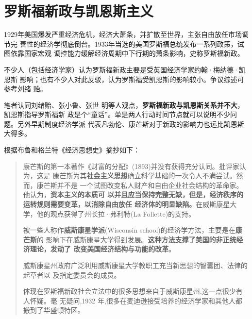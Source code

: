 \chapter{罗斯福新政与凯恩斯主义}


1929年美国爆发严重经济危机，经济大萧条，并扩散至世界，主张自由放任市场调节完
善性的经济学彻底倒台。1933年当选的美国罗斯福总统发布一系列政策，试图依靠国家宏观
调控能力缓解经济周期中下行期的萧条影响，史称罗斯福新政。

不少人（包括经济学家）认为罗斯福新政主要是受英国经济学家约翰·梅纳德·凯恩斯
影响；也有不少人对此反驳，认为罗斯福受凯恩斯的影响较小。争议综述可参考刘绪
贻。

笔者认同刘绪贻\cite{roosevelt}、张小鲁\cite{bijiao202002}、张世
明\cite{JJFX200100010}等人观点，\textbf{罗斯福新政与凯恩斯关系并不大}，凯恩斯指导罗斯福新
政是个“童话”。单是两人行动时间节点就可以说明不少问题。另外早期制度经济学派
代表凡勃伦、康芒斯对于新政的影响力也远比凯恩斯大得多。

根据布鲁和格兰特《经济思想史》摘抄如下：
\begin{quotation}
  康芒斯的第一本著作《财富的分配》(1893)并没有获得充分认同。批评家认为，这是
  康芒斯为其\textbf{社会主义思想}确立科学基础的一次令人不满尝试。然而，康芒斯并不是
  一个试图改变私人财产和自由企业社会结构的革命家。他认为，\textbf{资本主义的本质可
    以并且应当保持完整无缺，但是，经济秩序的运转规则需要变革，以消除自由放任
    经济体的明显缺陷。}在威斯康星大学，他的观点获得了州长拉·弗利特(La
  Follette)的支持。

  被一些人称作\textbf{威斯康星学派}(Wisconsin school)的经济学方法，主要是在\textbf{康芒斯}的
  影响下在威斯康星大学得到发展。\textbf{这种方法支撑了美国的非正统经济理论，发动了
    改变美国经济结构与功能的改革}。

  威斯康星州政府广泛利用威斯康星大学教职工充当新思想的智囊团、法律的起草者以
  及指定委员会的成员。

  体现在罗斯福新政社会立法中的很多思想来自于威斯康星州,这一点很少有人怀疑。毫
  无疑问,1932 年,很多在麦迪逊接受培养的经济学家和其他人都搬到了华盛顿特区。
\end{quotation}


